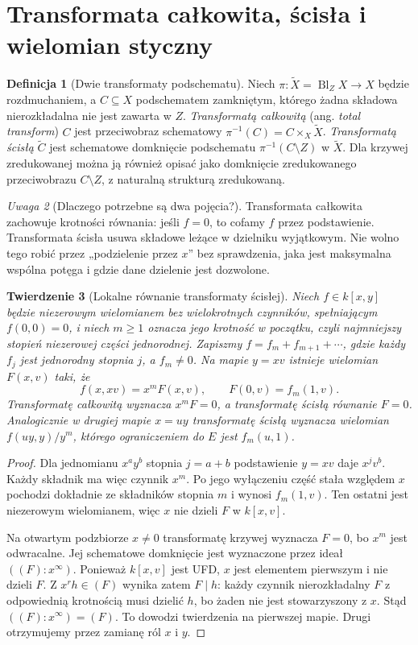 \documentclass[11pt,a4paper,openany]{report}
\numberwithin{equation}{section}
\theoremstyle{plain}
\newtheorem{twierdzenie}{Twierdzenie}[section]
\theoremstyle{definition}
\newtheorem{definicja}[twierdzenie]{Definicja}
\theoremstyle{remark}
\newtheorem{uwaga}[twierdzenie]{Uwaga}
\begin{document}
\section{Transformata całkowita, ścisła i wielomian styczny}
\label{sec:ga5-transform}

\begin{definicja}[Dwie transformaty podschematu]
\label{def:ga5-transform}
Niech $\pi:\widetilde X=\operatorname{Bl}_Z X\to X$
będzie rozdmuchaniem, a $C\subseteq X$ podschematem
zamkniętym, którego żadna składowa nierozkładalna
nie jest zawarta w $Z$. \emph{Transformatą całkowitą}
(ang. \emph{total transform}) $C$ jest przeciwobraz
schematowy $\pi^{-1}(C)=C\times_X\widetilde X$.
\emph{Transformatą ścisłą} $\widetilde C$ jest
schematowe domknięcie podschematu
$\pi^{-1}(C\setminus Z)$ w $\widetilde X$.
Dla krzywej zredukowanej można ją również opisać
jako domknięcie zredukowanego przeciwobrazu
$C\setminus Z$, z naturalną strukturą zredukowaną.
\end{definicja}

\begin{uwaga}[Dlaczego potrzebne są dwa pojęcia?]
Transformata całkowita zachowuje krotności równania:
jeśli $f=0$, to cofamy $f$ przez podstawienie.
Transformata ścisła usuwa składowe leżące w dzielniku
wyjątkowym. Nie wolno tego robić przez
„podzielenie przez $x$” bez sprawdzenia, jaka jest
maksymalna wspólna potęga i gdzie dane dzielenie
jest dozwolone.
\end{uwaga}

\begin{twierdzenie}[Lokalne równanie transformaty ścisłej]
\label{tw:ga5-strict-formula}
Niech $f\in k[x,y]$ będzie niezerowym wielomianem bez
wielokrotnych czynników, spełniającym $f(0,0)=0$,
i niech $m\ge1$ oznacza jego
krotność w początku, czyli najmniejszy stopień
niezerowej części jednorodnej. Zapiszmy
$f=f_m+f_{m+1}+\cdots$, gdzie każdy $f_j$
jest jednorodny stopnia $j$, a $f_m\ne0$.
Na mapie $y=xv$ istnieje wielomian $F(x,v)$ taki, że
\[
 f(x,xv)=x^mF(x,v),\qquad F(0,v)=f_m(1,v).
\]
Transformatę całkowitą wyznacza $x^mF=0$, a transformatę
ścisłą równanie $F=0$. Analogicznie w drugiej mapie
$x=uy$ transformatę ścisłą wyznacza wielomian
$f(uy,y)/y^m$, którego ograniczeniem do $E$ jest
$f_m(u,1)$.
\end{twierdzenie}
\begin{proof}
Dla jednomianu $x^ay^b$ stopnia $j=a+b$ podstawienie
$y=xv$ daje $x^jv^b$. Każdy składnik ma więc czynnik
$x^m$. Po jego wyłączeniu część stała względem $x$
pochodzi dokładnie ze składników stopnia $m$ i wynosi
$f_m(1,v)$. Ten ostatni jest niezerowym wielomianem,
więc $x$ nie dzieli $F$ w $k[x,v]$.

Na otwartym podzbiorze $x\ne0$ transformatę krzywej
wyznacza $F=0$, bo $x^m$ jest odwracalne.
Jej schematowe domknięcie jest wyznaczone przez ideał
$((F):x^\infty)$. Ponieważ $k[x,v]$ jest UFD,
$x$ jest elementem pierwszym i nie dzieli $F$.
Z $x^r h\in(F)$ wynika zatem $F\mid h$:
każdy czynnik nierozkładalny $F$ z odpowiednią
krotnością musi dzielić $h$, bo żaden nie jest
stowarzyszony z $x$. Stąd $((F):x^\infty)=(F)$.
To dowodzi twierdzenia na pierwszej mapie.
Drugi otrzymujemy przez zamianę ról $x$ i $y$.
\end{proof}
\end{document}
